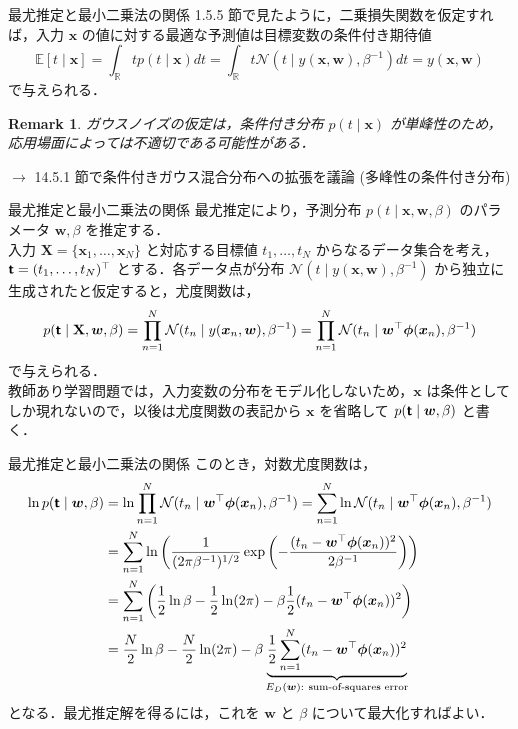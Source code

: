 \documentclass[uplatex,11pt,dvipdfmx,aspectratio=169,unicode,t]{beamer}
\newtheorem{rmk}{Remark}
\numberwithin{equation}{section}
\newcommand{\BE}{\mathbb{E}}
\newcommand{\BR}{\mathbb{R}}
\newcommand{\CN}{\mathcal{N}}
\newcommand{\mb}[1]{\mathbf{#1}}
\newcommand{\tb}[1]{\textbf{#1}}
\newcommand{\ts}[1]{\textsf{#1}}
\newcommand{\bs}[1]{\boldsymbol{#1}}
\newcommand{\1}{\bs{1}}
\newcommand{\0}{\bs{0}}
\begin{document}
\begin{frame}{最尤推定と最小二乗法の関係}
    1.5.5 節で見たように，二乗損失関数を仮定すれば，入力 $\bs{x}$ の値に対する最適な予測値は目標変数の条件付き期待値
    \begin{equation}
        \BE[t \mid \bs{x}] = \int_{\BR} tp(t \mid \bs{x})dt = \int_{\BR} t\CN(t \mid y(\bs{x},\bs{w}), \beta^{-1})dt = y(\bs{x},\bs{w})
    \end{equation}
    で与えられる．
    \begin{rmk}
        ガウスノイズの仮定は，条件付き分布 $p(t \mid \bs{x})$ が単峰性のため，応用場面によっては不適切である可能性がある．
    \end{rmk}
    $\longrightarrow$ 14.5.1 節で条件付きガウス混合分布への拡張を議論 (多峰性の条件付き分布)
\end{frame}

\begin{frame}{最尤推定と最小二乗法の関係}
    最尤推定により，予測分布 $p(t \mid \bs{x},\bs{w},\beta)$ のパラメータ $\bs{w},\beta$ を推定する．\\
    入力 $\mb{X} = \{\bs{x}_{1},\ldots,\bs{x}_{N}\}$ と対応する目標値 $t_{1},\ldots,t_{N}$ からなるデータ集合を考え，$\tb{\ts{t}} = (t_{1},\ldots,t_{N})^{\top}$ とする．各データ点が分布 $\CN(t \mid y(\bs{x},\bs{w}), \beta^{-1})$ から独立に生成されたと仮定すると，尤度関数は，
    \begin{equation}
        p(\tb{\ts{t}} \mid \mb{X},\bs{w},\beta) = \prod_{n=1}^{N} \CN(t_{n} \mid y(\bs{x}_{n},\bs{w}), \beta^{-1}) = \prod_{n=1}^{N} \CN(t_{n} \mid \bs{w}^{\top}\bs{\phi}(\bs{x}_{n}),\beta^{-1})
    \end{equation}
    で与えられる．\\
    教師あり学習問題では，入力変数の分布をモデル化しないため，$\bs{x}$ は条件としてしか現れないので，以後は尤度関数の表記から $\bs{x}$ を省略して $p(\tb{\ts{t}} \mid \bs{w},\beta)$ と書く．
\end{frame}

\begin{frame}{最尤推定と最小二乗法の関係}
    このとき，対数尤度関数は，
    \begin{align}
        \ln p(\tb{\ts{t}} \mid \bs{w},\beta) &= \ln \prod_{n=1}^{N} \CN(t_{n} \mid \bs{w}^{\top}\bs{\phi}(\bs{x}_{n}),\beta^{-1}) = \sum_{n=1}^{N} \ln \CN(t_{n} \mid \bs{w}^{\top}\bs{\phi}(\bs{x}_{n}),\beta^{-1}) \\
        &= \sum_{n=1}^{N} \ln \left(\frac{1}{(2\pi\beta^{-1})^{1/2}} \exp\left(-\frac{(t_{n} - \bs{w}^{\top}\bs{\phi}(\bs{x}_{n}))^{2}}{2\beta^{-1}}\right)\right) \\
        &= \sum_{n=1}^{N} \left(\frac{1}{2} \ln \beta - \frac{1}{2} \ln (2\pi) - \beta \frac{1}{2} (t_{n} - \bs{w}^{\top}\bs{\phi}(\bs{x}_{n}))^{2}\right) \\
        &= \frac{N}{2} \ln \beta - \frac{N}{2} \ln (2\pi) - \beta \underbrace{\frac{1}{2} \sum_{n=1}^{N} (t_{n} - \bs{w}^{\top}\bs{\phi}(\bs{x}_{n}))^{2}}_{E_{D}(\bs{w}):\ \text{sum-of-squares error}} \label{eq:log likelihood function}
    \end{align}
    となる．最尤推定解を得るには，これを $\bs{w}$ と $\beta$ について最大化すればよい．
\end{frame}
\end{document}

